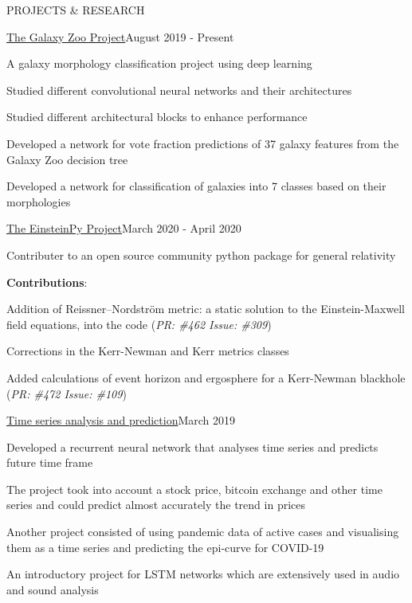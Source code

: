 \documentclass{resume} %
\begin{document}
\begin{rSection}{PROJECTS \& RESEARCH}

\begin{rSubsection}{\href{https://github.com/obi-wan-shinobi/Galaxy_Zoo}{The Galaxy Zoo Project}}{August 2019 - Present}{}{}
\item A galaxy morphology classification project using deep learning
\item Studied different convolutional neural networks and their architectures
\item Studied different architectural blocks to enhance performance
\item Developed a network for vote fraction predictions of 37 galaxy features from the Galaxy Zoo decision tree
\item Developed a network for classification of galaxies into 7 classes based on their morphologies
\end{rSubsection}

\begin{rSubsection}{\href{https://github.com/obi-wan-shinobi/einsteinpy}{The EinsteinPy Project}}{March 2020 - April 2020}{}{}
\item Contributer to an open source community python package for general relativity
\item \textbf{Contributions}:
\item Addition of  Reissner–Nordström metric: a static solution to the Einstein-Maxwell field equations, into the code (\textit{PR: \#462 Issue: \#309})
\item Corrections in the Kerr-Newman and Kerr metrics classes
\item Added calculations of event horizon and ergosphere for a Kerr-Newman blackhole (\textit{PR: \#472 Issue: \#109})
\end{rSubsection}

\begin{rSubsection}{\href{https://github.com/obi-wan-shinobi/BTC_predictor}{Time series analysis and prediction}}{March 2019}{}{}
\item Developed a recurrent neural network that analyses time series and predicts future time frame
\item The project took into account a stock price, bitcoin exchange and other time series and could predict almost accurately the trend in prices
\item Another project consisted of using pandemic data of active cases and visualising them as a time series and predicting the epi-curve for COVID-19
\item An introductory project for LSTM networks which are extensively used in audio and sound analysis
\end{rSubsection}


\end{rSection}
\end{document}
